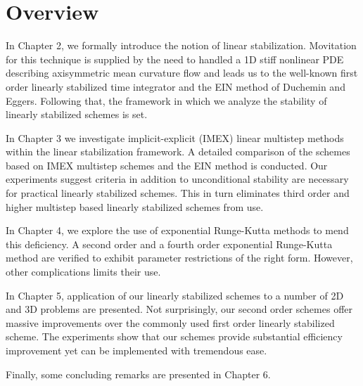 \section{Overview}
In Chapter 2, we formally introduce the notion of linear stabilization. Movitation for this technique is supplied by the need to handled a 1D stiff nonlinear PDE describing axisymmetric mean curvature flow and leads us to the well-known first order linearly stabilized time integrator and the EIN method of Duchemin and Eggers. Following that, the framework in which we analyze the stability of linearly stabilized schemes is set. 

In Chapter 3 we investigate implicit-explicit (IMEX) linear multistep methods within the linear stabilization framework. A detailed comparison of the schemes based on IMEX multistep schemes and the EIN method is conducted. Our experiments suggest criteria in addition to unconditional stability are necessary for practical linearly stabilized schemes. This in turn eliminates third order and higher multistep based linearly stabilized schemes from use. 

In Chapter 4, we explore the use of exponential Runge-Kutta methods to mend this deficiency. A second order and a fourth order exponential Runge-Kutta method are verified to exhibit parameter restrictions of the right form. However, other complications limits their use.

In Chapter 5, application of our linearly stabilized schemes to a number of 2D and 3D problems are presented. Not surprisingly, our second order schemes offer massive improvements over the commonly used first order linearly stabilized scheme. The experiments show that our schemes provide substantial efficiency improvement yet can be implemented with tremendous ease. 

Finally, some concluding remarks are presented in Chapter 6.  
 